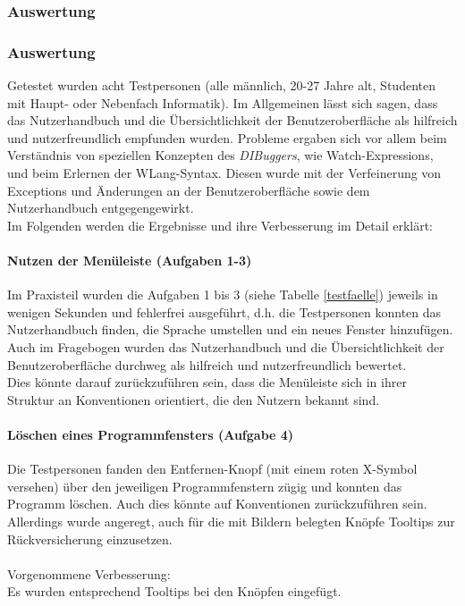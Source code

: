 \documentclass[parskip=full]{scrartcl}
\begin{document}
\subsubsection{Auswertung}

\subsubsection{Auswertung}
Getestet wurden acht Testpersonen (alle männlich, 20-27 Jahre alt, Studenten mit Haupt- oder Nebenfach Informatik).
Im Allgemeinen lässt sich sagen, dass das Nutzerhandbuch und die Übersichtlichkeit der Benutzeroberfläche als hilfreich und nutzerfreundlich empfunden wurden. Probleme ergaben sich vor allem beim Verständnis von speziellen Konzepten des \textit{DIBuggers}, wie Watch-Expressions, und beim Erlernen der WLang-Syntax. Diesen wurde mit der Verfeinerung von Exceptions und Änderungen an der Benutzeroberfläche sowie dem Nutzerhandbuch entgegengewirkt.\\
Im Folgenden werden die Ergebnisse und ihre Verbesserung im Detail erklärt:

\paragraph{Nutzen der Menüleiste (Aufgaben 1-3)}
Im Praxisteil wurden die Aufgaben 1 bis 3 (siehe Tabelle \ref{testfaelle}) jeweils in wenigen Sekunden und fehlerfrei ausgeführt, d.h. die Testpersonen konnten das Nutzerhandbuch finden, die Sprache umstellen und ein neues Fenster hinzufügen.\\
Auch im Fragebogen wurden das Nutzerhandbuch und die Übersichtlichkeit der Benutzeroberfläche durchweg als hilfreich und nutzerfreundlich bewertet.\\
Dies könnte darauf zurückzuführen sein, dass die Menüleiste sich in ihrer Struktur an Konventionen orientiert, die den Nutzern bekannt sind.

\paragraph{Löschen eines Programmfensters (Aufgabe 4)}
Die Testpersonen fanden den Entfernen-Knopf (mit einem roten X-Symbol versehen) über den jeweiligen Programmfenstern zügig und konnten das Programm löschen. Auch dies könnte auf Konventionen zurückzuführen sein. \\Allerdings wurde angeregt, auch für die mit Bildern belegten Knöpfe Tooltips zur Rückversicherung einzusetzen.\\\\
Vorgenommene Verbesserung:\\
Es wurden entsprechend Tooltips bei den Knöpfen eingefügt.
\end{document}
